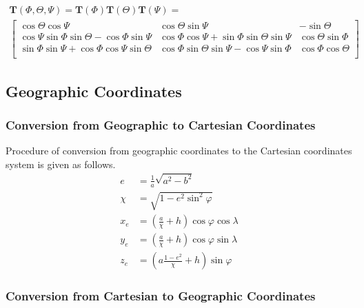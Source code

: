 \begin{equation}
  \begin{array}{c}
  \boldsymbol T \left( \Phi,\Theta,\Psi \right) =
  \boldsymbol T \left( \Phi \right)
  \boldsymbol T \left( \Theta \right) 
  \boldsymbol T \left( \Psi \right) = \\
  \left[
    \begin{matrix}
       \cos \Theta \cos \Psi &
       \cos \Theta \sin \Psi &
      -\sin \Theta \\
       \cos \Psi   \sin \Phi   \sin \Theta - \cos \Phi   \sin \Psi &
       \cos \Phi   \cos \Psi + \sin \Phi     \sin \Theta \sin \Psi &
       \cos \Theta \sin \Phi \\
       \sin \Phi   \sin \Psi + \cos \Phi     \cos \Psi   \sin \Theta &
       \cos \Phi   \sin \Theta \sin \Psi   - \cos \Psi   \sin \Phi &
       \cos \Phi   \cos \Theta \\
    \end{matrix}
  \right]
  \end{array}
\end{equation}

\subsection{Geographic Coordinates}

\subsubsection{Conversion from Geographic to Cartesian Coordinates}

Procedure of conversion from geographic coordinates to the Cartesian coordinates system is given as follows.
\begin{align}
  e    &= \frac{1}{a} \sqrt{a^2-b^2} \\
  \chi &= \sqrt{ 1 - e^2 \sin^2 \varphi } \\
  x_e  &= \left( \frac{a}{\chi} + h \right) \cos \varphi \cos \lambda \\
  y_e  &= \left( \frac{a}{\chi} + h \right) \cos \varphi \sin \lambda \\
  z_e  &= \left( a \frac{1-e^2}{\chi} + h \right) \sin \varphi
\end{align}

\subsubsection{Conversion from Cartesian to Geographic Coordinates}

